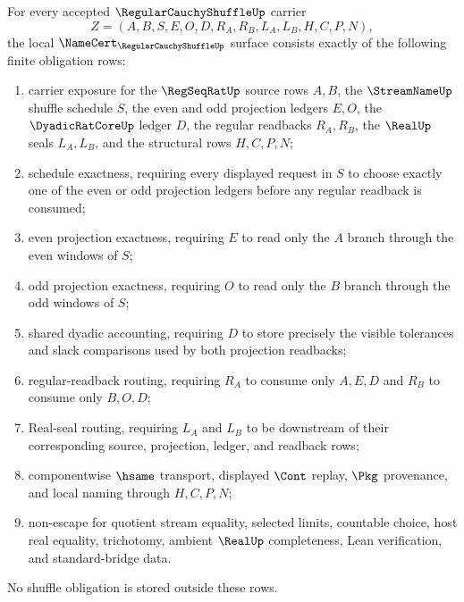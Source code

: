 \begin{theorem}
\label{thm:regular-cauchy-shuffle-namecert-obligations}
For every accepted $\RegularCauchyShuffleUp$ carrier
$$
Z=(A,B,S,E,O,D,R_A,R_B,L_A,L_B,H,C,P,N),
$$
the local $\NameCert_{\RegularCauchyShuffleUp}$ surface consists exactly of the following finite obligation rows:
\begin{enumerate}
\item carrier exposure for the $\RegSeqRatUp$ source rows $A,B$, the $\StreamNameUp$ shuffle schedule $S$, the even and odd projection ledgers $E,O$, the $\DyadicRatCoreUp$ ledger $D$, the regular readbacks $R_A,R_B$, the $\RealUp$ seals $L_A,L_B$, and the structural rows $H,C,P,N$;
\item schedule exactness, requiring every displayed request in $S$ to choose exactly one of the even or odd projection ledgers before any regular readback is consumed;
\item even projection exactness, requiring $E$ to read only the $A$ branch through the even windows of $S$;
\item odd projection exactness, requiring $O$ to read only the $B$ branch through the odd windows of $S$;
\item shared dyadic accounting, requiring $D$ to store precisely the visible tolerances and slack comparisons used by both projection readbacks;
\item regular-readback routing, requiring $R_A$ to consume only $A,E,D$ and $R_B$ to consume only $B,O,D$;
\item Real-seal routing, requiring $L_A$ and $L_B$ to be downstream of their corresponding source, projection, ledger, and readback rows;
\item componentwise $\hsame$ transport, displayed $\Cont$ replay, $\Pkg$ provenance, and local naming through $H,C,P,N$;
\item non-escape for quotient stream equality, selected limits, countable choice, host real equality, trichotomy, ambient $\RealUp$ completeness, Lean verification, and standard-bridge data.
\end{enumerate}
No shuffle obligation is stored outside these rows.
\end{theorem}

